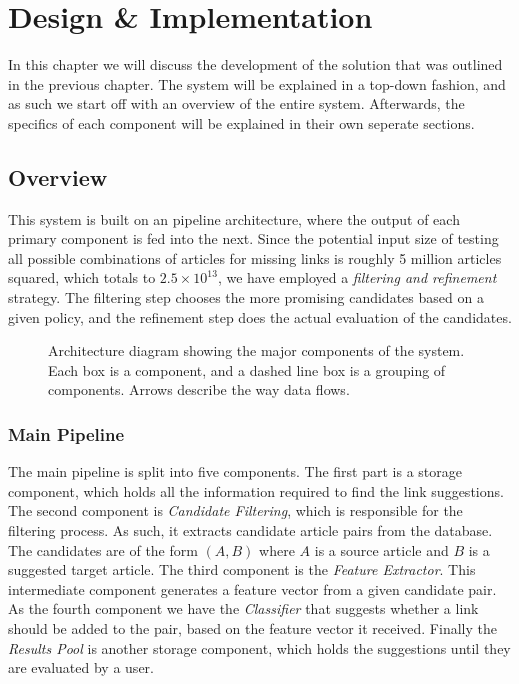 \chapter{Design \& Implementation}\label{chap:design}
In this chapter we will discuss the development of the solution that was outlined in the previous chapter. The system will be explained in a top-down fashion, and as such we start off with an overview of the entire system. Afterwards, the specifics of each component will be explained in their own seperate sections.

\section{Overview}\label{sec:design_overview}
This system is built on an pipeline architecture, where the output of each primary component is fed into the next. Since the potential input size of testing all possible combinations of articles for missing links is roughly 5 million articles squared, which totals to $2.5 \times 10^{13}$, we have employed a \emph{filtering and refinement} strategy. The filtering step chooses the more promising candidates based on a given policy, and the refinement step does the actual evaluation of the candidates.

\begin{figure}[tb]%
  \centering
  
\caption[Architecture diagram showing the major components of the system]{Architecture diagram showing the major components of the system. Each box is a component, and a dashed line box is a grouping of components. Arrows describe the way data flows.}%
\label{fig:system-overview}%
\end{figure}

\subsection{Main Pipeline}
The main pipeline is split into five components. The first part is a storage component, which holds all the information required to find the link suggestions. The second component is \emph{Candidate Filtering}, which is responsible for the filtering process. As such, it extracts candidate article pairs from the database. The candidates are of the form $(A,B)$ where $A$ is a source article and $B$ is a suggested target article. The third component is the \emph{Feature Extractor}. This intermediate component generates a feature vector from a given candidate pair. As the fourth component we have the \emph{Classifier} that suggests whether a link should be added to the pair, based on the feature vector it received. Finally the \emph{Results Pool} is another storage component, which holds the suggestions until they are evaluated by a user.

